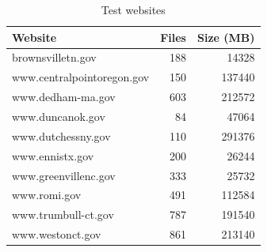 \documentclass[11pt]{article}
\begin{document}
\begin{table}[ht]
	\centering
	\begin{tabular}{lrr}
		\hline
		Website & Files & Size (MB) \\ 
		\hline
		brownsvilletn.gov & 188 & 14328 \\ 
		www.centralpointoregon.gov & 150 & 137440 \\ 
		www.dedham-ma.gov & 603 & 212572 \\ 
		www.duncanok.gov &  84 & 47064 \\ 
		www.dutchessny.gov & 110 & 291376 \\ 
		www.ennistx.gov & 200 & 26244 \\ 
		www.greenvillenc.gov & 333 & 25732 \\ 
		www.romi.gov & 491 & 112584 \\ 
		www.trumbull-ct.gov & 787 & 191540 \\ 
		www.westonct.gov & 861 & 213140 \\ 
		\hline
	\end{tabular}
	\caption{Test websites} 
\end{table}
\end{document}
